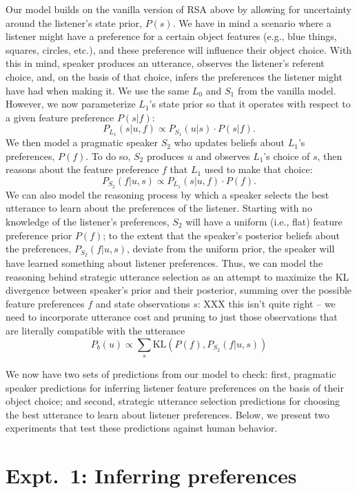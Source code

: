 \documentclass[10pt,a4paper]{article}
\begin{document}
Our model builds on the vanilla version of RSA above by allowing for uncertainty around the listener's state prior, $P(s)$. We have in mind a scenario where a listener might have a preference for a certain object features (e.g., blue things, squares, circles, etc.), and these preference will influence their object choice. With this in mind, speaker produces an utterance, observes the listener's referent choice, and, on the basis of that choice, infers the preferences the listener might have had when making it. We use the same $L_0$ and $S_1$ from the vanilla model. However, we now parameterize $L_1$'s state prior so that it operates with respect to a given feature preference $P(s|f)$:
$$P_{L_{1}}(s|u,f) \propto P_{S_{1}}(u|s) \cdot P(s|f).$$
We then model a pragmatic speaker $S_2$ who updates beliefs about $L_1$'s preferences, $P(f)$. To do so, $S_2$ produces $u$ and observes $L_1$'s choice of $s$, then reasons about the feature preference $f$ that $L_1$ used to make that choice:
$$P_{S_{2}}(f|u,s) \propto P_{L_{1}}(s|u,f) \cdot P(f).$$
We can also model the reasoning process by which a speaker selects the best utterance to learn about the preferences of the listener. Starting with no knowledge of the listener's preferences, $S_2$ will have a uniform (i.e., flat) feature preference prior $P(f)$; to the extent that the speaker's posterior beliefs about the preferences, $P_{S_{2}}(f|u,s)$, deviate from the uniform prior, the speaker will have learned something about listener preferences. Thus, we can model the reasoning behind strategic utterance selection as an attempt to maximize the KL divergence between speaker's prior and their posterior, summing over the possible feature preferences $f$ and state observations $s$: XXX this isn't quite right -- we need to incorporate utterance cost and pruning to just those observations that are literally compatible with the utterance
$$P_{b}(u) \propto \sum_{s}\textrm{KL}(P(f),P_{S_{2}}(f|u,s))$$

We now have two sets of predictions from our model to check: first, pragmatic speaker predictions for inferring listener feature preferences on the basis of their object choice; and second, strategic utterance selection predictions for choosing the best utterance to learn about listener preferences. Below, we present two experiments that test these predictions against human behavior.


\section{Expt.~1: Inferring preferences}
\end{document}
